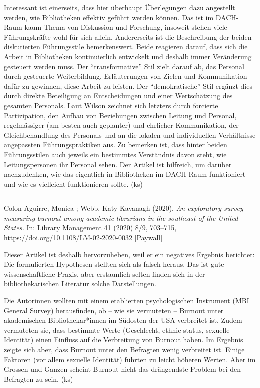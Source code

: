 \documentclass[a4paper,
fontsize=11pt,
oneside,
numbers=noperiodatend,
parskip=half-,
bibliography=totoc,
final
]{scrartcl}
\begin{document}
Interessant ist einerseits, dass hier überhaupt Überlegungen dazu
angestellt werden, wie Bibliotheken effektiv geführt werden können. Das
ist im DACH-Raum kaum Thema von Diskussion und Forschung, insoweit
stehen viele Führungskräfte wohl für sich allein. Andererseits ist die
Beschreibung der beiden diskutierten Führungsstile bemerkenswert. Beide
reagieren darauf, dass sich die Arbeit in Bibliotheken kontinuierlich
entwickelt und deshalb immer Veränderung gesteuert werden muss. Der
\enquote{transformative} Stil zielt darauf ab, das Personal durch
gesteuerte Weiterbildung, Erläuterungen von Zielen und Kommunikation
dafür zu gewinnen, diese Arbeit zu leisten. Der \enquote{demokratische}
Stil ergänzt dies durch direkte Beteiligung an Entscheidungen und einer
Wertschätzung des gesamten Personals. Laut Wilson zeichnet sich letzters
durch forcierte Partizipation, den Aufbau von Beziehungen zwischen
Leitung und Personal, regelmässiger (am besten auch geplanter) und
ehrlicher Kommunikation, der Gleichbehandlung des Personals und an die
lokalen und individuellen Verhältnisse angepassten Führungspraktiken
aus. Zu bemerken ist, dass hinter beiden Führungsstilen auch jeweils ein
bestimmtes Verständnis davon steht, wie Leitungspersonen ihr Personal
sehen. Der Artikel ist hilfreich, um darüber nachzudenken, wie das
eigentlich in Bibliotheken im DACH-Raum funktioniert und wie es
vielleicht funktionieren sollte. (ks)

\begin{center}\rule{0.5\linewidth}{0.5pt}\end{center}

Colon-Aguirre, Monica ; Webb, Katy Kavanagh (2020). \emph{An exploratory
survey measuring burnout among academic librarians in the southeast of
the United States.} In: Library Management 41 (2020) 8/9, 703--715,
\url{https://doi.org/10.1108/LM-02-2020-0032} {[}Paywall{]}

Dieser Artikel ist deshalb hervorzuheben, weil er ein negatives Ergebnis
berichtet: Die formulierten Hypothesen stellten sich als falsch heraus.
Das ist gute wissenschaftliche Praxis, aber erstaunlich selten finden
sich in der bibliothekarischen Literatur solche Darstellungen.

Die Autorinnen wollten mit einem etablierten psychologischen Instrument
(MBI General Survey) herausfinden, ob -- wie sie vermuteten -- Burnout
unter akademischen Bibliothekar*innen im Südosten der USA verbreitet
ist. Zudem vermuteten sie, dass bestimmte Werte (Geschlecht, ethnic
status, sexuelle Identität) einen Einfluss auf die Verbreitung von
Burnout haben. Im Ergebnis zeigte sich aber, dass Burnout unter den
Befragten wenig verbreitet ist. Einige Faktoren (vor allem sexuelle
Identität) führten zu leicht höheren Werten. Aber im Grossen und Ganzen
scheint Burnout nicht das drängendste Problem bei den Befragten zu sein.
(ks)
\end{document}
